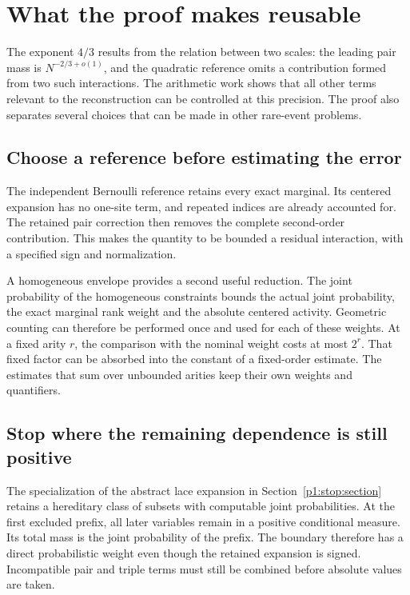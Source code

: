 \section{What the proof makes reusable}
\label{p1:discussion}

The exponent \(4/3\) results from the relation between two scales:
the leading pair mass is \(N^{-2/3+o(1)}\), and the quadratic
reference omits a contribution formed from two such interactions.
The arithmetic work shows that all other terms relevant to the
reconstruction can be controlled at this precision. The proof also
separates several choices that can be made in other rare-event
problems.

\subsection{Choose a reference before estimating the error}

The independent Bernoulli reference retains every exact marginal.
Its centered expansion has no one-site term, and repeated indices
are already accounted for. The retained pair correction then
removes the complete second-order contribution. This makes the
quantity to be bounded a residual interaction, with a specified
sign and normalization.

A homogeneous envelope provides a second useful reduction. The
joint probability of the homogeneous constraints bounds the actual
joint probability, the exact marginal rank weight and the absolute
centered activity. Geometric counting can therefore be performed
once and used for each of these weights. At a fixed arity \(r\),
the comparison with the nominal weight costs at most \(2^r\).
That fixed factor can be absorbed into the constant of a fixed-order
estimate. The estimates that sum over unbounded arities keep their
own weights and quantifiers.

\subsection{Stop where the remaining dependence is still positive}

The specialization of the abstract lace expansion
\cite{zeilberger1997} in Section~\ref{p1:stop:section} retains a
hereditary class of subsets with computable joint probabilities.
At the first excluded prefix, all later variables remain in a
positive conditional measure. Its total mass is the joint
probability of the prefix. The boundary therefore has a direct
probabilistic weight even though the retained expansion is signed.
Incompatible pair and triple terms must still be combined before
absolute values are taken.

